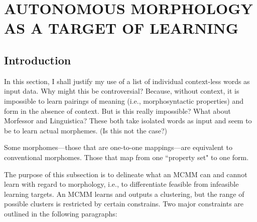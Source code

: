 \chapter{AUTONOMOUS MORPHOLOGY AS A TARGET OF LEARNING}

\section{Introduction} %
In this section, I shall justify my use of a list of individual context-less words as input data. 
Why might this be controversial? Because, without context, it is impossible to learn pairings of
meaning (i.e., morphosyntactic properties) and form in the absence of context. But is this really impossible?
What about Morfessor and Linguistica? These both take isolated words as input and seem
to be to learn actual morphemes. (Is this not the case?)

Some morphomes---those that are one-to-one mappings---are equivalent to conventional morphomes.
Those that map from one ``property set" to one form. 

The purpose of this subsection is to delineate what an MCMM can and cannot learn 
with regard to morphology, i.e., to differentiate feasible from infeasible learning targets.
An MCMM learns and outputs a clustering, but the range of possible 
clusters is restricted by certain constrains. Two major constraints 
are outlined in the following paragraphs:

